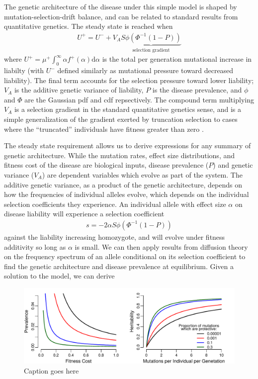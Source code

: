 \documentclass[11pt]{article}
\begin{document}
The genetic architecture of the disease under this simple model is shaped by mutation-selection-drift balance, and can be related to standard results from quantitative genetics. The steady state is reached when
\begin{align}
  U^+ = U^- + V_A \underbrace{S\phi\left(\Phi^{-1}\left(1-P\right)\right)}_{\text{selection gradient}}
  \label{univariate-bulk-eq}
\end{align}
where $U^+ = \mu^+\int_{0}^{\infty}\alpha f^+\left(\alpha\right)\mathrm{d}\alpha$ is the total per generation mutational increase in liabilty (with $U^-$ defined similarly as mutational pressure toward decreased liability). The final term accounts for the selection pressure toward lower liability; $V_A$ is the additive genetic variance of liability, $P$ is the disease prevalence, and $\phi$ and $\Phi$ are the Gaussian pdf and cdf repsectively. The compound term multiplying $V_A$ is a selection gradient in the standard quantitative genetics sense, and is a simple generalization of the gradient exerted by truncation selection to cases where the ``truncated'' individuals have fitness greater than zero  \cite{Charlesworth}.

The steady state requirement allows us to derive expressions for any summary of genetic architecture. While the mutation rates, effect size distributions, and fitness cost of the disease are biological inputs, disease prevalence ($P$) and genetic variance ($V_A$) are dependent variables which evolve as part of the system. The additive genetic variance, as a product of the genetic architecture, depends on how the frequencies of individual alleles evolve, which depends on the individual selection coefficients they experience. An individual allele with effect size $\alpha$ on disease liability will experience a selection coefficient
\begin{align}
  s = -2\alpha S\phi\left(\Phi^{-1}\left(1-P\right)\right)
  \label{sel-coef}
\end{align}
against the liability increasing homozygote, and will evolve under fitness additivity so long as $\alpha$ is small. We can then apply results from diffusion theory on the frequency spectrum of an allele conditional on its selection coefficient \cite{Sawyer:1992vb, Bustamante:2001wi,Ewens2004} to find the genetic architecture and disease prevalence at equilibrium. Given a solution to the model, we can derive 



  \begin{figure}
    \includegraphics[width=\textwidth]{../figures/SimpleModelSolutions.pdf}
    \caption{Caption goes here}
  \end{figure}
  
\end{document}
